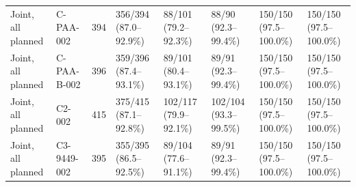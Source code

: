 \begin{tabular}{llllllll}
Joint, all planned & C-PAA-002 & 394 & 356/394 (87.0--92.9\%) & 88/101 (79.2--92.3\%) & 88/90 (92.3--99.4\%) & 150/150 (97.5--100.0\%) & 150/150 (97.5--100.0\%) \\
Joint, all planned & C-PAA-B-002 & 396 & 359/396 (87.4--93.1\%) & 89/101 (80.4--93.1\%) & 89/91 (92.3--99.4\%) & 150/150 (97.5--100.0\%) & 150/150 (97.5--100.0\%) \\
Joint, all planned & C2-002 & 415 & 375/415 (87.1--92.8\%) & 102/117 (79.9--92.1\%) & 102/104 (93.3--99.5\%) & 150/150 (97.5--100.0\%) & 150/150 (97.5--100.0\%) \\
Joint, all planned & C3-9449-002 & 395 & 355/395 (86.5--92.5\%) & 89/104 (77.6--91.1\%) & 89/91 (92.3--99.4\%) & 150/150 (97.5--100.0\%) & 150/150 (97.5--100.0\%) \\
\hline
\end{tabular}
